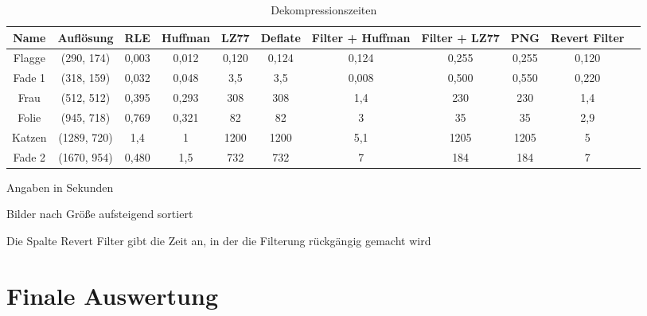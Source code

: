 \documentclass[conference]{IEEEtran}
\begin{document}
  \begin{table}
    \renewcommand*{\arraystretch}{1.1}
    \centering
    \begin{threeparttable}
      \caption{Dekompressionszeiten}
      \label{tab:dekompzeiten}
        \begin{tabular}{c *9{c} S[table-format=5.9]}

        \toprule
        Name    &  Auflösung  & RLE     & Huffman   & LZ77  & Deflate   & Filter + Huffman  & Filter + LZ77     & PNG       & Revert Filter \\
        \midrule
        Flagge  & (290, 174)  & 0,003   & 0,012     & 0,120 & 0,124     & 0,124             & 0,255             & 0,255     & 0,120       \\
        Fade 1  & (318, 159)  & 0,032   & 0,048     & 3,5   & 3,5       & 0,008             & 0,500             & 0,550     & 0,220       \\
        Frau    & (512, 512)  & 0,395   & 0,293     & 308   & 308       & 1,4               & 230               & 230       & 1,4         \\
        Folie   & (945, 718)  & 0,769   & 0,321     & 82    & 82        & 3                 & 35                & 35        & 2,9        \\
        Katzen  & (1289, 720) & 1,4     & 1         & 1200  & 1200      & 5,1               & 1205              & 1205      & 5          \\ 
        Fade 2  & (1670, 954) & 0,480   & 1,5       & 732   & 732       & 7                 & 184               & 184       & 7        
      \end{tabular}
      \par{} Angaben in Sekunden
      \par{} Bilder nach Größe aufsteigend sortiert
      \par{} Die Spalte Revert Filter gibt die Zeit an, in der die Filterung rückgängig gemacht wird
    \end{threeparttable}
  \end{table}





\section{Finale Auswertung}




\end{document}
